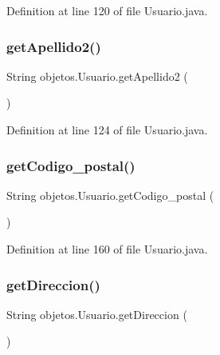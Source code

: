Definition at line 120 of file Usuario.\+java.

\mbox{\label{classobjetos_1_1_usuario_a1d3064bdecaadd7ff0487f0715780ee5}} 
\subsubsection{\texorpdfstring{get\+Apellido2()}{getApellido2()}}
{\footnotesize\ttfamily String objetos.\+Usuario.\+get\+Apellido2 (\begin{DoxyParamCaption}{ }\end{DoxyParamCaption})}



Definition at line 124 of file Usuario.\+java.

\mbox{\label{classobjetos_1_1_usuario_a7e8a422150526d3436159d63817c225d}} 
\subsubsection{\texorpdfstring{get\+Codigo\+\_\+postal()}{getCodigo\_postal()}}
{\footnotesize\ttfamily String objetos.\+Usuario.\+get\+Codigo\+\_\+postal (\begin{DoxyParamCaption}{ }\end{DoxyParamCaption})}



Definition at line 160 of file Usuario.\+java.

\mbox{\label{classobjetos_1_1_usuario_a3e13dfa01d027561e7866f4cd1c2e3c5}} 
\subsubsection{\texorpdfstring{get\+Direccion()}{getDireccion()}}
{\footnotesize\ttfamily String objetos.\+Usuario.\+get\+Direccion (\begin{DoxyParamCaption}{ }\end{DoxyParamCaption})}



